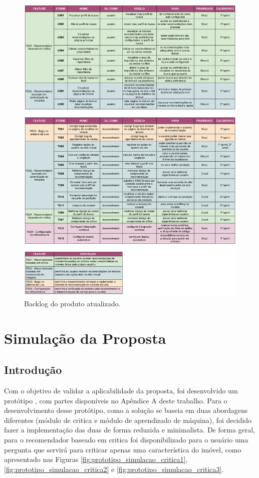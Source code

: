 \begin{apendicesenv}
\begin{figure}[H]
    \centering
    \includegraphics[scale=0.42]{figuras/desenvolvimento/Backlog.png}
    \caption[Backlog do produto atualizado]{Backlog do produto atualizado.}
    \label{fig:apendice_backlog}
\end{figure}

\chapter{Simulação da Proposta}
\label{apendiceA}

\section{Introdução}

Com o objetivo de validar a aplicabilidade da proposta, foi desenvolvido um protótipo , com partes disponíveis no Apêndice A deste trabalho. Para o desenvolvimento desse protótipo, como a solução se baseia em duas abordagens diferentes (módulo de critica e módulo de aprendizado de máquina), foi decidido fazer a implementação das duas de forma reduzida e minimalista. De forma geral, para o recomendador baseado em critica foi disponibilizado para o usuário uma pergunta que servirá para criticar apenas uma característica do imóvel, como apresentado nas Figuras \ref{fig:prototipo_simulacao_critica1}, \ref{fig:prototipo_simulacao_critica2} e \ref{fig:prototipo_simulacao_critica3}.


\end{apendicesenv}
